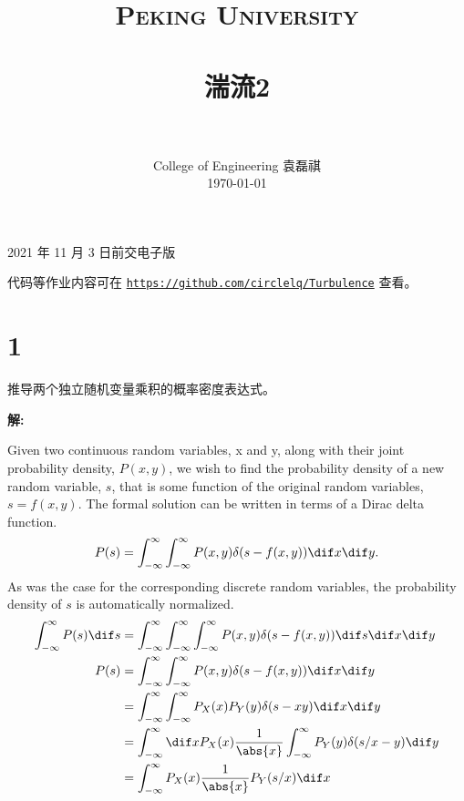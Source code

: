 \documentclass[12pt,a4]{ctexart}
\title{
	\vspace{-1in}
	\usefont{OT1}{bch}{b}{n}
	\normalfont \normalsize \textsc{\LARGE Peking University}\\[1cm] %
	\horrule{0.5pt} \\[0.5cm]
	\huge \bfseries{湍流2} \\
	\horrule{2pt} \\[0.5cm]
}
\author{
	\normalfont									\normalsize
	College of Engineering \quad 2001111690  \quad 袁磊祺\\	\normalsize
	\today
}
\date{}
\begin{document}


\maketitle

2021 年 11 月 3 日前交电子版

代码等作业内容可在 \texttt{\href{https://github.com/circlelq/Turbulence}{https://github.com/circlelq/Turbulence}} 查看。

\section{1}

推导两个独立随机变量乘积的概率密度表达式。

\textsf{\hspace{-2em}\sf  \textbf{解:}}

Given two continuous random variables, x and y, along with their joint probability density, $P(x,y)$, we wish to find the probability density of a new random variable, $s$, that is some function of the original random variables, $s = f (x, y)$. The formal solution can be written in terms of a Dirac delta function.\cite{Swendsen}
\begin{equation}
	P(s)=\int_{-\infty}^{\infty} \int_{-\infty}^{\infty} P(x, y) \delta(s-f(x, y)) \dif x \dif y.
	\label{eq:1Dirac}
\end{equation}
As was the case for the corresponding discrete random variables, the probability density of $s$ is automatically normalized.
\begin{equation}
	\begin{aligned}
		\int_{-\infty}^{\infty} P(s) \dif s & =\int_{-\infty}^{\infty} \int_{-\infty}^{\infty} \int_{-\infty}^{\infty} P(x, y) \delta(s-f(x, y)) \dif s \dif x \dif y \\
		P(s) & =\int_{-\infty}^{\infty} \int_{-\infty}^{\infty} P(x, y) \delta(s-f(x, y)) \dif x \dif y                        \\
			 & =\int_{-\infty}^{\infty} \int_{-\infty}^{\infty} P_X(x) P_Y(y) \delta(s-xy) \dif x \dif y                       \\
			 & =\int_{-\infty}^{\infty} \dif x P_X(x) \frac{1}{\abs{x}} \int_{-\infty}^{\infty}   P_Y(y) \delta(s/x-y)  \dif y \\
			 & =\int_{-\infty}^{\infty}  P_X(x) \frac{1}{\abs{x}} P_Y(s/x) \dif x                                              \\
	\end{aligned}
\end{equation}
\end{document}
